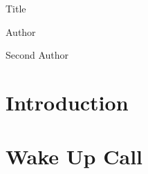 \documentclass[letterpaper,12pt]{extarticle}
\begin{document}
\begin{center}

    \Large Title
    
    \vspace{3mm}

    \large Author

    \large Second Author

    \vspace{3mm}
    \normalsize 
\end{center}


\section{Introduction}

\lipsum[10-15]

\section{Wake Up Call}

\lipsum*[5-8]
\end{document}
